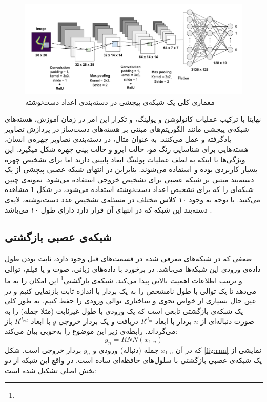 \begin{figure}[t!]
	\centering
	\includegraphics[scale=0.3]{figures/cnn-handwriting.png}
	\caption[معماری کلی یک شبکه‌ی عصبی پیچشی]{معماری کلی یک شبکه‌ی پیچشی در دسته‌بندی اعداد دست‌نوشته}
	\label{fig:cnn}
\end{figure}
نهایتا با ترکیب عملیات کانولوشن و پولینگ، و تکرار این امر در زمان آموزش، هسته‌های شبکه‌ی پیچشی مانند الگوریتم‌های مبتنی بر هسته‌های دست‌ساز در پردازش تصاویر یادگرفته و عمل می‌کنند. به عنوان مثال، در دسته‌بندی تصاویر چهره‌ی انسان، هسته‌هایی برای شناسایی رنگ مو، حالت ابرو و حالت بینی چهره شکل میگیرد. این ویژگی‌ها با اینکه به لطف عملیات پولینگ ابعاد پایینی دارند اما برای تشخیص چهره بسیار کاربردی بوده و استفاده می‌شوند. بنابراین در انتهای شبکه عصبی پیچشی از یک دسته‌بند مبتنی بر شبکه عصبی برای تشخیص خروجی استفاده می‌شود. نمونه‌ی چنین شبکه‌ای را که برای تشخیص اعداد دست‌نوشته استفاده می‌شود، در شکل \ref{fig:cnn} مشاهده می‌کنید. با توجه به وجود ۱۰ کلاس مختلف در مسئله‌ی تشخیص عدد دست‌نوشته، لایه‌ی دسته‌بند این شبکه که در انتهای آن قرار دارد دارای طول ۱۰ می‌باشد \cite{patel2019mnist}.
\subsection{شبکه‌‌ی عصبی بازگشتی}
ضعفی که در شبکه‌های معرفی شده در قسمت‌های قبل وجود دارد، ثابت بودن طول داده‌ی ورودی این شبکه‌ها می‌باشد.
در برخورد با داده‌های زبانی، صوت و یا فیلم، توالی و ترتیب اطلاعات اهمیت بالایی پیدا می‌کند. شبکه‌ی بازگشتی\footnote{} این امکان را به ما می‌دهد تا یک توالی با طول نامشخص را به یک بردار با اندازه ثابت بازنمایی کنیم و در عین حال بسیاری از خواص نحوی و ساختاری توالی ورودی را حفظ کنیم. به طور کلی یک شبکه‌ی بازگشتی تابعی است که یک ورودی با طول غیرثابت (مثلا جمله) را به صورت دنباله‌ای از $n$ بردار با ابعاد $R^{d_{in}}$ دریافت و یک بردار خروجی $y$ با ابعاد $R^{d_{out}}$ باز می‌گرداند. رابطه‌ی زیر این موضوع را به‌خوبی بیان می‌کند:
\begin{equation}
\label{eqn:RNN}
	y_{n} = RNN(x_{1: n})
\end{equation}
که در آن $x_{1:n}$ جمله (دنباله) ورودی و $y_n$ بردار خروجی است. شکل \ref{fig:rnn} نمایشی از یک شبکه‌ی عصبی بازگشتی با سلول‌های حافظه‌ای ساده است. در واقع این شبکه از دو بخش اصلی تشکیل شده است:\\

